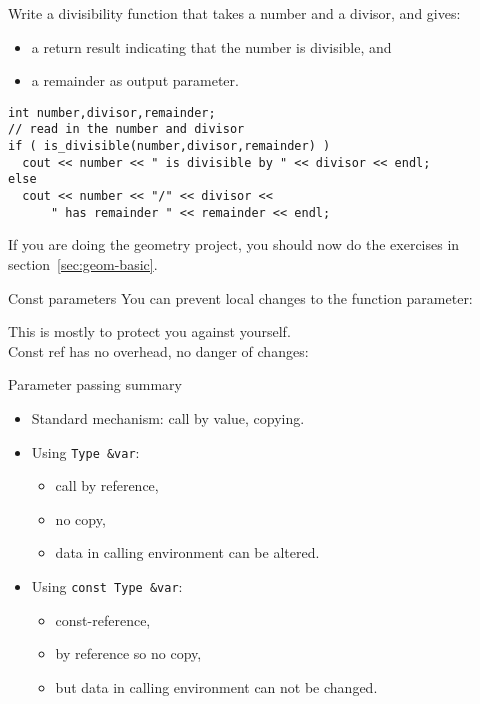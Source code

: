 \begin{exercise}
  \label{ex:div-remain}
  Write a divisibility function that takes a number and a divisor, and gives:
  \begin{itemize}
  \item a  return result indicating that the number is
    divisible, and
  \item a remainder as output parameter.
  \end{itemize}

{\small
\begin{lstlisting}
int number,divisor,remainder;
// read in the number and divisor
if ( is_divisible(number,divisor,remainder) )
  cout << number << " is divisible by " << divisor << endl;
else
  cout << number << "/" << divisor <<
      " has remainder " << remainder << endl;
\end{lstlisting}
}
\end{exercise}

\begin{exercise}
  If you are doing the geometry project, you should now do the exercises
  in section~\ref{sec:geom-basic}.
\end{exercise}

\begin{block}{Const parameters}
  \label{sl:pass-constref}
  You can prevent local changes to the function parameter:


  This is mostly to protect you against yourself.\\
  Const ref has no overhead, no danger of changes:

\end{block}

\begin{block}{Parameter passing summary}
  \label{sl:pass-summary}
  \begin{itemize}
  \item Standard mechanism: call by value, copying.
  \item Using \lstinline{Type &var}:
    \begin{itemize}
    \item call by reference,\item no copy, \item data in calling
      environment can be altered.
    \end{itemize}
  \item Using \lstinline{const Type &var}: 
    \begin{itemize}
    \item const-reference, \item by reference so no copy, \item but
      data in calling environment can not be changed.
    \end{itemize}
  \end{itemize}
\end{block}
